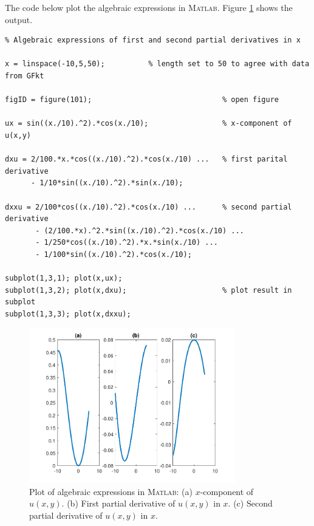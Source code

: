 \documentclass[paper=a4, fontsize=12pt]{article} %
\begin{document}
\newpage

The code below plot the algebraic expressions in \textsc{Matlab}. Figure \ref{fig:algebraic} shows the output.

\begin{lstlisting}
% Algebraic expressions of first and second partial derivatives in x

x = linspace(-10,5,50);		     % length set to 50 to agree with data from GFkt

figID = figure(101);                              % open figure

ux = sin((x./10).^2).*cos(x./10);                 % x-component of u(x,y)

dxu = 2/100.*x.*cos((x./10).^2).*cos(x./10) ...   % first parital derivative
      - 1/10*sin((x./10).^2).*sin(x./10);

dxxu = 2/100*cos((x./10).^2).*cos(x./10) ...      % second partial derivative
       - (2/100.*x).^2.*sin((x./10).^2).*cos(x./10) ...
       - 1/250*cos((x./10).^2).*x.*sin(x./10) ...
       - 1/100*sin((x./10).^2).*cos(x./10);
       
subplot(1,3,1); plot(x,ux);
subplot(1,3,2); plot(x,dxu);                      % plot result in subplot
subplot(1,3,3); plot(x,dxxu);

\end{lstlisting}


\begin{figure}[H]
  \centering
  \includegraphics[width=0.8\textwidth]{algebraicDeriv.pdf}
  \caption{\small Plot of algebraic expressions in \textsc{Matlab}: (a) $x$-component of $u(x,y)$. (b) First partial derivative of $u(x,y)$ in $x$. (c) Second partial derivative of $u(x,y)$ in $x$.\label{fig:algebraic}}
\end{figure}
\end{document}
